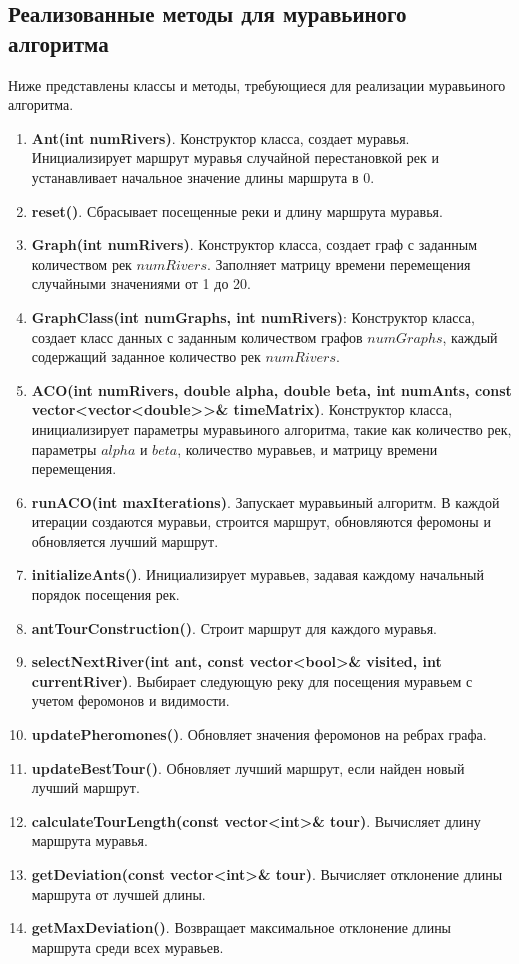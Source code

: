 \documentclass[12pt, a4paper]{article}
\begin{document}
\subsection{Реализованные методы для муравьиного алгоритма}
Ниже представлены классы и методы, требующиеся для реализации 
муравьиного алгоритма.
\begin{enumerate}
    \item \textbf{Ant(int numRivers)}. Конструктор класса, создает 
    муравья. Инициализирует 
    маршрут муравья случайной перестановкой рек и устанавливает 
    начальное значение длины маршрута в 0.
    \item \textbf{reset()}. Сбрасывает посещенные реки и длину маршрута 
    муравья.
    \item \textbf{Graph(int numRivers)}. Конструктор класса, создает 
    граф с заданным количеством рек $numRivers$. Заполняет 
    матрицу времени перемещения случайными значениями от 1 до 20.
    \item \textbf{GraphClass(int numGraphs, int numRivers)}: 
    Конструктор класса, создает класс данных с заданным количеством 
    графов $numGraphs$, каждый содержащий заданное количество рек 
    $numRivers$.
    \item \textbf{ACO(int numRivers, double alpha, double beta, int 
    numAnts, const vector<vector<double>>\& timeMatrix)}. Конструктор 
    класса, инициализирует параметры муравьиного алгоритма, такие как 
    количество рек, параметры $alpha$ и $beta$, 
    количество муравьев, и матрицу времени перемещения.
    \item \textbf{runACO(int maxIterations)}. Запускает муравьиный 
    алгоритм. В каждой итерации создаются муравьи, строится маршрут, 
    обновляются феромоны и обновляется лучший маршрут.
    \item \textbf{initializeAnts()}. Инициализирует муравьев, задавая 
    каждому начальный порядок посещения рек.
    \item \textbf{antTourConstruction()}. Строит маршрут для каждого 
    муравья.
    \item \textbf{selectNextRiver(int ant, const vector<bool>\& 
    visited, int currentRiver)}. Выбирает следующую реку для посещения 
    муравьем с учетом феромонов и видимости.
    \item \textbf{updatePheromones()}. Обновляет значения феромонов на 
    ребрах графа.
    \item \textbf{updateBestTour()}. Обновляет лучший маршрут, если
    найден новый лучший маршрут.
    \item \textbf{calculateTourLength(const vector<int>\& tour)}.
    Вычисляет длину маршрута муравья.
    \item \textbf{getDeviation(const vector<int>\& tour)}. Вычисляет 
    отклонение длины маршрута от лучшей длины.
    \item \textbf{getMaxDeviation()}. Возвращает максимальное 
    отклонение длины маршрута среди всех муравьев.
\end{enumerate}
\newpage
\end{document}
